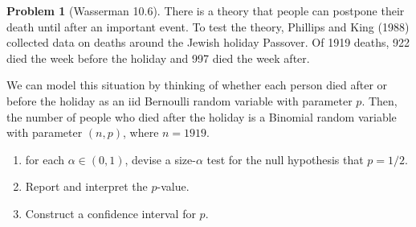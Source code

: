 \documentclass[13pt]{article}
\theoremstyle{definition}
\newtheorem{problem}[theorem]{Problem}
\theoremstyle{remark}
\begin{document}
\begin{problem}[Wasserman 10.6]
There is a theory that people can postpone their death until after an  important event. To test the theory, Phillips and King (1988) collected  data on deaths around the Jewish holiday Passover. 
Of 1919 deaths, 922  died the week before the holiday and 997 died the week after. 

    We can model this situation by thinking of whether each person died after or before the holiday as an iid Bernoulli random variable with parameter $p$.
    Then, the number of people who died after the holiday is a Binomial random variable with parameter $(n,p)$, where $n=1919$.

    \begin{enumerate}[label=(\alph*),topsep=0pt]
        \item for each $\alpha\in(0,1)$, devise a size-$\alpha$ test for the null hypothesis that $p = 1/2$. 
        \item Report and  interpret the $p$-value. 
        \item Construct a confidence interval for $p$.
    \end{enumerate}
\end{problem}
\end{document}
